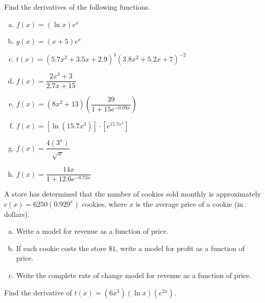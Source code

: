 \documentclass[notes]{subfiles}
\begin{document}
		\begin{ex}
			Find the derivatives of the following functions.
			\begin{enumerate}[(a)]
				\item $f(x) = (\ln x)e^x$
					
				\item $g(x) = (x+5)e^x$  
		 			
				\item $t(x) = (5.7x^2+3.5x+2.9)^3(3.8x^2+5.2x+7)^{-2}$
					\newpage
					
				\item $f(x) = \dfrac{2x^3+3}{2.7x+15}$
					
		 		\item $f(x) = (8x^2 + 13)\left(\dfrac{39}{1+15e^{-0.09x}}\right)$
		 		
		 		\item $f(x) = [\ln (15.7x^3)]\cdot [e^{15.7x^3}]$  
		 		
		 		\item $f(x) = \dfrac{4(3^x)}{\sqrt{x}}$  
		 			\newpage
		 			
		 		\item $f(x) = \dfrac{14x}{1 + 12.6e^{-0.73x}}$  
			\end{enumerate}
		\end{ex}
		
 		\begin{ex}
 			A store has determined that the number of cookies sold monthly is approximately $c(x) = 6250(0.929^x)$ cookies, where $x$ is the average price of a cookie (in dollars).
 				\begin{enumerate}[(a)]
 					\item Write a model for revenue as a function of price.  
 						\vs{1}
 					\item If each cookie costs the store $\$1$, write a model for profit as a function of price.  
 						\vs{1}
 					\item Write the complete rate of change model for revenue as a function of price.  
 						\vs{1}
 				\end{enumerate}
 		\end{ex}
 			\newpage
 			
 		\begin{ex}
			Find the derivative of $t(x) = (6x^3)(\ln x)(e^{2x})$.
		\end{ex}
		
	\clearpage
\end{document}
